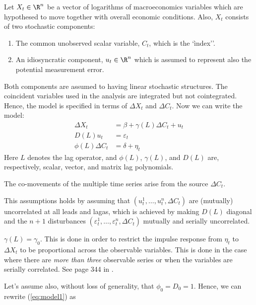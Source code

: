 
Let $X_t\in\R^n$ be  a vector of logarithms of macroeconomics variables which are  hypothesed to move together with overall economic conditions. Also, $X_t$ consists of two stochastic components:
\begin{enumerate}
	\item The common unobserved scalar variable, $C_t$, which is the `ìndex''.
	\item An idiosyncratic component, $u_t\in\R^n$ which is assumed to represent also the potential measurement error.
\end{enumerate}
Both components are assumed to having linear stochastic structures. The coincident variables used in the analysis are integrated but not cointegrated. Hence, the model is specified in terms of $\Delta X_t$ and $\Delta C_t$. Now we can write the model:
\begin{equation}\label{eq:model1}
	\begin{aligned}
		\Delta X_t &= \beta + \gamma(L) \Delta C_t + u_t \\
		D(L) u_t &= \varepsilon_t \\
		\phi(L) \Delta C_t &= \delta + \eta_t
	\end{aligned}
\end{equation}
Here $L$ denotes the lag operator, and $\phi(L)$, $\gamma(L)$, and $D(L)$ are, respectively, scalar, vector, and matrix lag polynomials.

\assumption The co-movements of the multiple time series arise from the source $\Delta C_t$.

This assumptions holds by assuming that $\left(u_t^1,\ldots, u_t^n, \Delta C_t\right)$ are (mutually) uncorrelated at all leads and lagas, which is achieved by making $D(L)$ diagonal and the $n+1$ disturbances $\left(\varepsilon_t^1,\ldots, \varepsilon_t^n, \Delta C_t\right)$ mutually and serially uncorrelated.

\assumption $\gamma(L) = \gamma_0$. This is done in order to restrict the impulse response from $\eta_t$ to $\Delta X_t$ to be proportional across the observable variables. This is done in the case where there are \emph{more than three} observable series or when the variables are serially correlated. See page 344 in .

Let's assume also, without loss of generality, that $\phi_0 = D_0 = 1$. Hence, we can rewrite (\ref{eq:model1}) as

